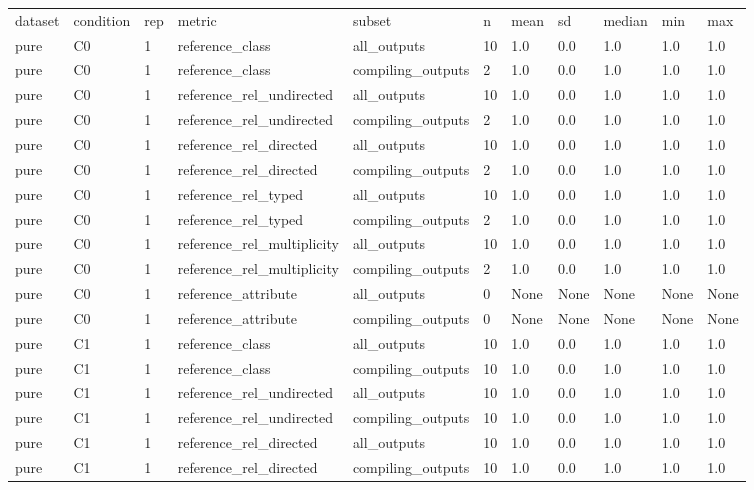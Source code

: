 \begin{tabular}{lllllllllll}
dataset & condition & rep & metric & subset & n & mean & sd & median & min & max \\
pure & C0 & 1 & reference\_class & all\_outputs & 10 & 1.0 & 0.0 & 1.0 & 1.0 & 1.0 \\
pure & C0 & 1 & reference\_class & compiling\_outputs & 2 & 1.0 & 0.0 & 1.0 & 1.0 & 1.0 \\
pure & C0 & 1 & reference\_rel\_undirected & all\_outputs & 10 & 1.0 & 0.0 & 1.0 & 1.0 & 1.0 \\
pure & C0 & 1 & reference\_rel\_undirected & compiling\_outputs & 2 & 1.0 & 0.0 & 1.0 & 1.0 & 1.0 \\
pure & C0 & 1 & reference\_rel\_directed & all\_outputs & 10 & 1.0 & 0.0 & 1.0 & 1.0 & 1.0 \\
pure & C0 & 1 & reference\_rel\_directed & compiling\_outputs & 2 & 1.0 & 0.0 & 1.0 & 1.0 & 1.0 \\
pure & C0 & 1 & reference\_rel\_typed & all\_outputs & 10 & 1.0 & 0.0 & 1.0 & 1.0 & 1.0 \\
pure & C0 & 1 & reference\_rel\_typed & compiling\_outputs & 2 & 1.0 & 0.0 & 1.0 & 1.0 & 1.0 \\
pure & C0 & 1 & reference\_rel\_multiplicity & all\_outputs & 10 & 1.0 & 0.0 & 1.0 & 1.0 & 1.0 \\
pure & C0 & 1 & reference\_rel\_multiplicity & compiling\_outputs & 2 & 1.0 & 0.0 & 1.0 & 1.0 & 1.0 \\
pure & C0 & 1 & reference\_attribute & all\_outputs & 0 & None & None & None & None & None \\
pure & C0 & 1 & reference\_attribute & compiling\_outputs & 0 & None & None & None & None & None \\
pure & C1 & 1 & reference\_class & all\_outputs & 10 & 1.0 & 0.0 & 1.0 & 1.0 & 1.0 \\
pure & C1 & 1 & reference\_class & compiling\_outputs & 10 & 1.0 & 0.0 & 1.0 & 1.0 & 1.0 \\
pure & C1 & 1 & reference\_rel\_undirected & all\_outputs & 10 & 1.0 & 0.0 & 1.0 & 1.0 & 1.0 \\
pure & C1 & 1 & reference\_rel\_undirected & compiling\_outputs & 10 & 1.0 & 0.0 & 1.0 & 1.0 & 1.0 \\
pure & C1 & 1 & reference\_rel\_directed & all\_outputs & 10 & 1.0 & 0.0 & 1.0 & 1.0 & 1.0 \\
pure & C1 & 1 & reference\_rel\_directed & compiling\_outputs & 10 & 1.0 & 0.0 & 1.0 & 1.0 & 1.0 \\

\end{tabular}
